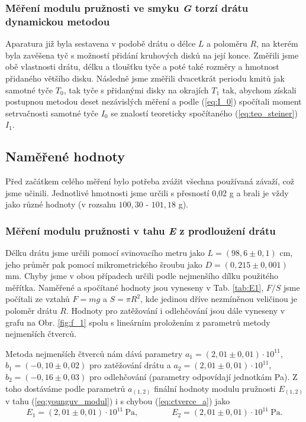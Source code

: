 \documentclass[english]{article}
\newcommand{\unit}[1]{\mathrm{#1}}
\begin{document}
			
			\subsubsection{Měření modulu pružnosti ve smyku \emph{G} torzí drátu dynamickou metodou}
					Aparatura již byla sestavena v podobě drátu o délce $L$ a poloměru $R$, na kterém byla zavěšena tyč s možností přidání kruhových disků na její konce. Změřili jsme obě vlastnosti drátu, délku a tloušťku tyče a poté také rozměry a hmotnost přidaného většího disku. Následně jsme  změřili dvacetkrát periodu kmitů jak samotné tyče $T_0$, tak tyče s přidanými disky na okrajích $T_1$ tak, abychom získali postupnou metodou deset nezávislých měření a podle (\ref{eq:I_0}) spočítali moment setrvačnosti samotné tyče $I_0$ se znalostí teoreticky spočítaného (\ref{eq:teo_steiner}) $I_1$.
		
	\subsection{Naměřené hodnoty}
			Před začátkem celého měření bylo potřeba zvážit všechna používaná závaží, což jsme učinili. Jednotlivé hmotnosti jsme určili s přesností 0,02 g a brali je vždy jako různé hodnoty (v rozsahu $100,30$ - $101,18$ g).
			\subsubsection{Měření modulu pružnosti v tahu \emph{E} z prodloužení drátu}
						Délku drátu jsme určili pomocí svinovacího metru jako $L = (98,6\pm0,1)$ cm, jeho průměr pak pomocí mikrometrického šroubu jako $D=(0,215\pm0,001)$ mm. Chyby jsme v obou případech určili podle nejmenšího dílku použitého měřítka.
						Naměřené a spočítané hodnoty jsou vyneseny v Tab. \ref{tab:E1}, $F/S$ jsme počítali ze vztahů $F=mg$ a $S=\pi R^2$, kde jedinou dříve nezmíněnou veličinou je poloměr drátu $R$. Hodnoty pro zatěžování i odlehčování jsou dále vyneseny v grafu na Obr. \ref{fig:f_1} spolu s lineárním proložením z parametrů metody nejmenších čtverců.
					
						Metoda nejmenších čtverců \cite{bib:ctverce} nám dává parametry $a_1 = (2,01\pm0,01)\cdot 10^{11}$, $b_1 = (-0,10\pm0,02)$ pro zatěžování drátu a $a_2 = (2,01\pm0,01)\cdot 10^{11}$, $b_2 = (-0,16\pm0,03)$ pro odlehčování (parametry odpovídají jednotkám Pa). Z toho dostáváme podle parametrů $a_{(1,2)}$ finální hodnoty modulu pružnosti $E_{(1,2)}$ v tahu (\ref{eq:younguv_modul}) i s chybou (\ref{eq:ctverce_a}) jako 
						\begin{equation}
								E_1 = (2,01\pm0,01)       \cdot \unit{10^{11}\ Pa,} \qquad \qquad
								E_2 = (2,01\pm0,01)       \cdot \unit{10^{11}\ Pa.}
						\end{equation}
\end{document}
